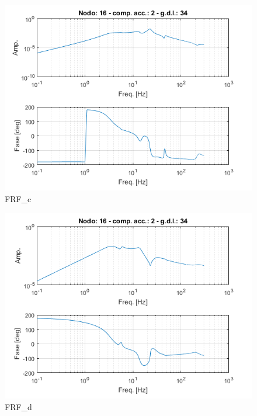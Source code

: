 \documentclass[12pt, a4paper]{article}
\begin{document}
	\begin{figure}[h]
		\centering
		\includegraphics[scale=0.8]{FRF_3}
		\caption{FRF\_c}
	\end{figure}
	\begin{figure}[h]
		\centering
		\includegraphics[scale=0.8]{FRF_4}
		\caption{FRF\_d}
	\end{figure}
	
	\clearpage
\end{document}
